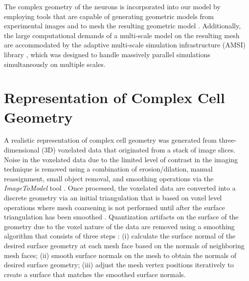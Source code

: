 \documentclass[]{interact}
\begin{document}
The complex geometry of the neurons is incorporated into our model by employing tools \citep{simmetrix} that are capable of generating geometric models from experimental images \citep{Klaas_conference, Klaas:2013ug} and to mesh the resulting geometric model \citep{Shephard:2000vc}. Additionally, the large computational demands of a multi-scale model on the resulting mesh are accommodated by the adaptive multi-scale simulation infrastructure (AMSI) library \citep{Delalondre:2010kt,Tobin:2017ip}, which was designed to handle massively parallel simulations simultaneously on multiple scales.

\section{Representation of Complex Cell Geometry}

A realistic representation of complex cell geometry was generated from three-dimensional (3D) voxelated data that originated from a stack of image slices. Noise in the voxelated data due to the limited level of contrast in the imaging technique is removed using a combination of erosion/dilation, manual reassignment, small object removal, and smoothing operations via the \textit{ImageToModel} tool \citep{Klaas:2013ug, Klaas_conference, simmetrix}. Once processed, the voxelated data are converted into a discrete geometry via an initial triangulation that is based on voxel level operations where mesh coarsening is not performed until after the surface triangulation has been smoothed \citep{Klaas:2013ug}. Quantization artifacts on the surface of the geometry due to the voxel nature of the data are removed using a smoothing algorithm that consists of three steps \citep{Klaas:2013ug}: (i) calculate the surface normal of the desired surface geometry at each mesh face based on the normals of neighboring mesh faces; (ii) smooth surface normals on the mesh to obtain the normals of desired surface geometry; (iii) adjust the mesh vertex positions iteratively to create a surface that matches the smoothed surface normals.
\end{document}
